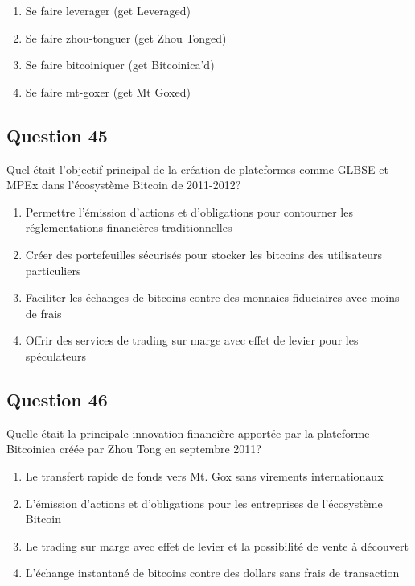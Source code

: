 \documentclass[12pt,a4paper]{article}
\begin{document}
\begin{enumerate}[label=\Alph*., leftmargin=*]
\item Se faire leverager (get Leveraged)
\item Se faire zhou-tonguer (get Zhou Tonged)
\item Se faire bitcoiniquer (get Bitcoinica'd)
\item Se faire mt-goxer (get Mt Goxed)
\end{enumerate}

\bigskip


\subsection*{Question 45}
Quel était l'objectif principal de la création de plateformes comme GLBSE et MPEx dans l'écosystème Bitcoin de 2011-2012?

\begin{enumerate}[label=\Alph*., leftmargin=*]
\item Permettre l'émission d'actions et d'obligations pour contourner les réglementations financières traditionnelles
\item Créer des portefeuilles sécurisés pour stocker les bitcoins des utilisateurs particuliers
\item Faciliter les échanges de bitcoins contre des monnaies fiduciaires avec moins de frais
\item Offrir des services de trading sur marge avec effet de levier pour les spéculateurs
\end{enumerate}

\bigskip


\subsection*{Question 46}
Quelle était la principale innovation financière apportée par la plateforme Bitcoinica créée par Zhou Tong en septembre 2011?

\begin{enumerate}[label=\Alph*., leftmargin=*]
\item Le transfert rapide de fonds vers Mt. Gox sans virements internationaux
\item L'émission d'actions et d'obligations pour les entreprises de l'écosystème Bitcoin
\item Le trading sur marge avec effet de levier et la possibilité de vente à découvert
\item L'échange instantané de bitcoins contre des dollars sans frais de transaction
\end{enumerate}
\end{document}
